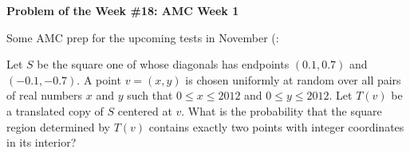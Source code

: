 \begin{potw}\vspace{5pt}
{\large\textbf{Problem of the Week \#18: AMC Week 1}}\vspace{5pt}

Some AMC prep for the upcoming tests in November (:\V

Let $S$ be the square one of whose diagonals has endpoints $(0.1,0.7)$ and $(-0.1,-0.7)$. A point $v=(x,y)$ is chosen uniformly at random over all pairs of real numbers $x$ and $y$ such that $0 \le x \le 2012$ and $0\le y\le 2012$. Let $T(v)$ be a translated copy of $S$ centered at $v$. What is the probability that the square region determined by $T(v)$ contains exactly two points with integer coordinates in its interior?
\end{potw}\V
